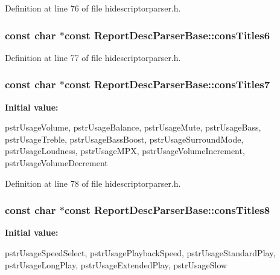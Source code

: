 \-Definition at line 76 of file hidescriptorparser.\-h.

\hypertarget{class_report_desc_parser_base_af4da29c34852a2589de1c64a0bf8e4b3}{
\subsubsection[{cons\-Titles6}]{\setlength{\rightskip}{0pt plus 5cm}const char $\ast$const {\bf \-Report\-Desc\-Parser\-Base\-::cons\-Titles6}}}\label{class_report_desc_parser_base_af4da29c34852a2589de1c64a0bf8e4b3}


\-Definition at line 77 of file hidescriptorparser.\-h.

\hypertarget{class_report_desc_parser_base_ac1cf3d87296aa74a35627079a5cd1753}{
\subsubsection[{cons\-Titles7}]{\setlength{\rightskip}{0pt plus 5cm}const char $\ast$const {\bf \-Report\-Desc\-Parser\-Base\-::cons\-Titles7}}}\label{class_report_desc_parser_base_ac1cf3d87296aa74a35627079a5cd1753}
{\bfseries \-Initial value\-:}
\begin{DoxyCode}
 {
        pstrUsageVolume,
        pstrUsageBalance,
        pstrUsageMute,
        pstrUsageBass,
        pstrUsageTreble,
        pstrUsageBassBoost,
        pstrUsageSurroundMode,
        pstrUsageLoudness,
        pstrUsageMPX,
        pstrUsageVolumeIncrement,
        pstrUsageVolumeDecrement
}
\end{DoxyCode}


\-Definition at line 78 of file hidescriptorparser.\-h.

\hypertarget{class_report_desc_parser_base_a3b4a0c98b10afe968027e78281efc752}{
\subsubsection[{cons\-Titles8}]{\setlength{\rightskip}{0pt plus 5cm}const char $\ast$const {\bf \-Report\-Desc\-Parser\-Base\-::cons\-Titles8}}}\label{class_report_desc_parser_base_a3b4a0c98b10afe968027e78281efc752}
{\bfseries \-Initial value\-:}
\begin{DoxyCode}
 {
        pstrUsageSpeedSelect,
        pstrUsagePlaybackSpeed,
        pstrUsageStandardPlay,
        pstrUsageLongPlay,
        pstrUsageExtendedPlay,
        pstrUsageSlow
}
\end{DoxyCode}


